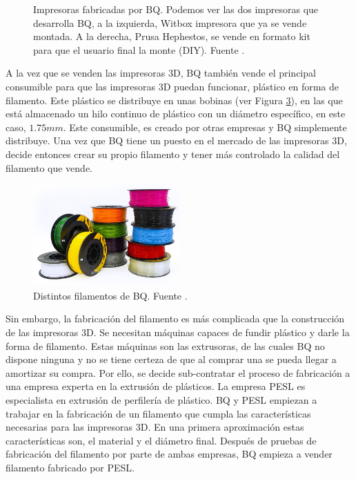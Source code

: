 \begin{figure}[!h]
\begin{subfigure}[b]{0.3\textwidth}
        \label{fig:estado_hephestos}
    \end{subfigure}
    \caption[Impresoras fabricadas por BQ.]{Impresoras fabricadas por BQ. Podemos ver las dos impresoras que desarrolla BQ, a la izquierda, Witbox impresora que ya se vende montada. A la derecha, Prusa Hephestos, se vende en formato kit para que el usuario final la monte (DIY). Fuente \cite{bq}.}
    \label{fig:impresoras_bq}
\end{figure}

A la vez que se venden las impresoras 3D, BQ también vende el principal consumible para que las impresoras 3D puedan funcionar, plástico en forma de filamento. Este plástico se distribuye en unas bobinas (ver Figura \ref{fig:estado_filamento}), en las que está almacenado un hilo continuo de plástico con un diámetro específico, en este caso, $1.75mm$. Este consumible, es creado por otras empresas y BQ simplemente distribuye. Una vez que BQ tiene un puesto en el mercado de las impresoras 3D, decide entonces crear su propio filamento y tener más controlado la calidad del filamento que vende.

\begin{figure}[!ht]
    \centering
    \includegraphics[width=0.5\textwidth]{images/filamento_bq.png}
    \caption[Distintos filamentos de BQ.]{Distintos filamentos de BQ. Fuente \cite{bq}.}
    \label{fig:estado_filamento}
\end{figure}

Sin embargo, la fabricación del filamento es más complicada que la construcción de las impresoras 3D. Se necesitan máquinas capaces de fundir plástico y darle la forma de filamento. Estas máquinas son las extrusoras, de las cuales BQ no dispone ninguna y no se tiene certeza de que al comprar una se pueda llegar a amortizar su compra. Por ello, se decide sub-contratar el proceso de fabricación a una empresa experta en la extrusión de plásticos. La empresa PESL es especialista en extrusión de perfilería de plástico. BQ y PESL empiezan a trabajar en la fabricación de un filamento que cumpla las características necesarias para las impresoras 3D. En una primera aproximación estas características son, el material y el diámetro final. Después de pruebas de fabricación del filamento por parte de ambas empresas, BQ empieza a vender filamento fabricado por PESL.\\

